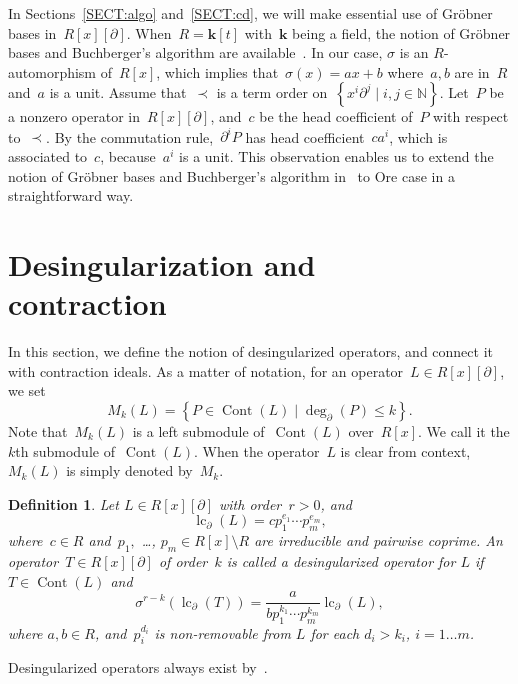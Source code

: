 \documentclass{sig-alternate}
\newcommand{\bN} { {\mathbb{N}}}
\newcommand{\cont}{\operatorname{Cont}}
\newcommand{\lc}{\operatorname{lc}}
\newcommand{\si} { {\sigma}}
\newcommand{\pa}{\partial}
\newtheorem{definition}[theorem]{Definition}
\begin{document}
In Sections~\ref{SECT:algo} and~\ref{SECT:cd}, we will make essential use of Gr\"obner bases in~$R[x][\pa]$.
When~$R=\mathbf{k}[t]$ with~$\mathbf{k}$ being a field, the notion of Gr\"obner bases and Buchberger's algorithm are available~\cite{Weispfenning1990}.
In our case, $\sigma$ is an $R$-automorphism of~$R[x]$, which implies that~$\sigma(x) = a x + b$
where~$a, b$ are in~$R$ and~$a$ is a unit.
Assume that~$\prec$ is a term order on~$\left\{x^i \pa^j \mid i, j \in \bN \right\}$. Let~$P$ be a nonzero operator in~$R[x][\pa]$,
and~$c$ be the head coefficient of~$P$ with respect to~$\prec$. By the commutation rule,~$\pa^i P$ has head coefficient~$c a^i$,
which is associated to~$c$, because~$a^i$ is a unit. This observation enables us to extend
the notion of Gr\"obner bases and Buchberger's algorithm in~\cite{Weispfenning1993, Saito1999} to Ore case in a straightforward way.
\section{Desingularization and \\ contraction}\label{SECT:dc}

In this section, we define the notion of desingularized operators, and connect it with contraction ideals.
As a matter of notation,
for an operator~$L \in R[x][\pa]$, we set
\[   M_k(L) = \left\{  P \in \cont(L) \mid  \deg_\pa(P) \le k \right\}. \]
Note that~$M_k(L)$ is a left submodule of~$\cont(L)$ over~$R[x]$. We call it the $k$th submodule
of~$\cont(L)$. When the operator~$L$ is clear from context, $M_k(L)$ is simply denoted by~$M_k$.
\begin{definition}\label{DEF:desingularization}
Let $L \in R[x][\pa]$ with order~$r > 0$, and
\begin{equation} \label{EQ:factor}
\lc_{\pa}(L) = c p_1^{e_1} \cdots p_m^{e_m},
\end{equation}
where~$c \in R$ and~$p_1,$ \ldots, $p_m \in R[x] \setminus R$ are irreducible and pairwise coprime.
An operator~$T \in R[x][\pa]$ of order~$k$ is called a {\em desingularized operator for $L$}
if $T \in \cont(L)$ and
\begin{equation} \label{EQ:dop}
\si^{r - k}(\lc_{\pa}(T)) = \frac{a}{b p_1^{k_1} \cdots p_m^{k_m}} \lc_{\pa}(L) ,
\end{equation}
 where $a, b \in R$, and~$p_i^{d_i}$ is non-removable from $L$ for each $d_i > k_i$, $i = 1 \ldots m$.
\end{definition}

Desingularized operators always exist by~\cite[Lemma 4]{Chen2016}.
\end{document}
